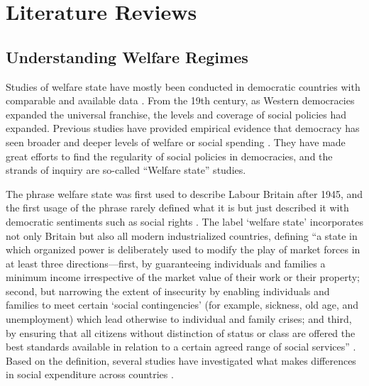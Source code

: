 \documentclass[12pt, letterpage, notitlepage]{article}
\begin{document}
\section{Literature Reviews} 
\subsection{Understanding Welfare Regimes} 
Studies of welfare state have mostly been conducted in democratic countries with comparable and available data \citep{Jessop1984, Gosta1989, Gosta1990, Rudra2005, Huber2008, Hudson2009}. From the 19th century, as Western democracies expanded the universal franchise, the levels and coverage of social policies had expanded. Previous studies have provided empirical evidence that democracy has seen broader and deeper levels of welfare or social spending \citep{Lindert2005,Stasavage2005,HaggardKaufman2008}. They have made great efforts to find the regularity of social policies in democracies, and the strands of inquiry are so-called ``Welfare state'' studies.\par

The phrase welfare state was first used to describe Labour Britain after 1945, and the first usage of the phrase rarely defined what it is but just described it with democratic sentiments such as social rights \citep[9-10]{Briggs1961}. The label ‘welfare state’ incorporates not only Britain but also all modern industrialized countries, defining “a state in which organized power is deliberately used to modify the play of market forces in at least three directions---first, by guaranteeing individuals and families a minimum income irrespective of the market value of their work or their property; second, but narrowing the extent of insecurity by enabling individuals and families to meet certain ‘social contingencies’ (for example, sickness, old age, and unemployment) which lead otherwise to individual and family crises; and third, by ensuring that all citizens without distinction of status or class are offered the best standards available in relation to a certain agreed range of social services” \citep[14]{Briggs1961}. Based on the definition, several studies have investigated what makes differences in social expenditure across countries \citep{Cameron1978, Rodrik1998, Adsera2002}.\par
\end{document}
